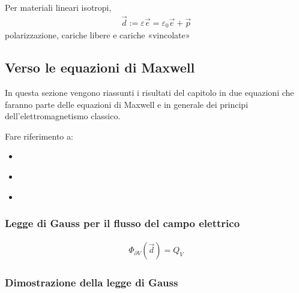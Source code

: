 \documentclass[letterpaper,10pt,italian]{jupyterBook}
\begin{document}
\sphinxAtStartPar
Per materiali lineari isotropi,
\begin{equation*}
\begin{split}\vec{d} := \varepsilon \vec{e} = \varepsilon_0 \vec{e} + \vec{p}\end{split}
\end{equation*}
\sphinxAtStartPar
{} polarizzazione, cariche libere e cariche «vincolate»


\subsection{Verso le equazioni di Maxwell}
\label{\detokenize{ch/electromagnetism/electrostatics:verso-le-equazioni-di-maxwell}}\label{\detokenize{ch/electromagnetism/electrostatics:physics-hs-electromagnetism-electrostatics-maxwell}}
\sphinxAtStartPar
In questa sezione vengono riassunti i risultati del capitolo in due equazioni che faranno parte delle equazioni di Maxwell e in generale dei principi dell’elettromagnetismo classico.

\sphinxAtStartPar
Fare riferimento a:
\begin{itemize}
\item {} 
\sphinxAtStartPar
{\hyperref[\detokenize{ch/electromagnetism/electrostatics:physics-hs-electromagnetism-electrostatics-maxwell}]{}}

\item {} 
\sphinxAtStartPar
{\hyperref[\detokenize{ch/electromagnetism/electromagnetism-steady:physics-hs-electromagnetism-electromagnetism-steady-maxwell}]{}}

\item {} 
\sphinxAtStartPar
{\hyperref[\detokenize{ch/electromagnetism/electromagnetism-general:physics-hs-electromagnetism-electromagnetism-general-maxwell}]{}}

\end{itemize}


\subsubsection{Legge di Gauss per il flusso del campo elettrico}
\label{\detokenize{ch/electromagnetism/electrostatics:legge-di-gauss-per-il-flusso-del-campo-elettrico}}\label{\detokenize{ch/electromagnetism/electrostatics:physics-hs-electromagnetism-electrostatics-maxwell-gauss}}\begin{equation*}
\begin{split}\Phi_{\partial V}(\vec{d}) = Q_V\end{split}
\end{equation*}\subsubsection*{Dimostrazione della legge di Gauss}
\end{document}
